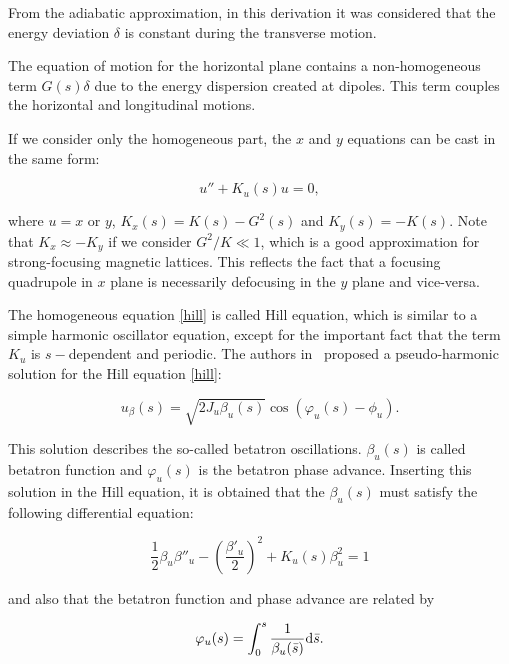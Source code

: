 From the adiabatic approximation, in this derivation it was considered that the energy deviation $\delta$ is constant during the transverse motion.

The equation of motion for the horizontal plane contains a non-homogeneous term $G(s)\delta$ due to the energy dispersion created at dipoles. This term couples the horizontal and longitudinal motions.

If we consider only the homogeneous part, the $x$ and $y$ equations can be cast in the same form:

\begin{equation}
u'' + K_u(s) u = 0,
\label{hill}
\end{equation}

where $u = x$ or $y$, $K_x(s) = K(s) - G^2(s)$ and $K_y(s) = -K(s)$. Note that $K_x \approx -K_y$ if we consider $G^2/K \ll 1$, which is a good approximation for strong-focusing magnetic lattices. This reflects the fact that a focusing quadrupole in $x$ plane is necessarily defocusing in the $y$ plane and vice-versa. 

The homogeneous equation \eqref{hill} is called Hill equation, which is similar to a simple harmonic oscillator equation, except for the important fact that the term $K_u$ is $s-$dependent and periodic. The authors in~\cite{CourantSnyder1958} proposed a pseudo-harmonic solution for the Hill equation \eqref{hill}:

\begin{equation}
    u_{\beta}(s) = \sqrt{2 J_u \beta_u (s)} \cos \left(\varphi_u(s) - \phi_u\right).
    \label{eq:beta_oscillation}
\end{equation}

This solution describes the so-called betatron oscillations. $\beta_u(s)$ is called betatron function and $\varphi_u(s)$ is the betatron phase advance. Inserting this solution in the Hill equation, it is obtained that the $\beta_u(s)$ must satisfy the following differential equation:

\begin{equation}
    \dfrac{1}{2}\beta_u {\beta''_u} -  \left(\dfrac{\beta'_u}{2}\right)^2 + K_u(s) \beta^2_u = 1
    \label{beta_equation}
\end{equation}

and also that the betatron function and phase advance are related by

\begin{equation}
\varphi_u(s) = \int_{0}^{s} \dfrac{1}{\beta_u(\bar{s})} \mathrm{d} \bar{s}.
\end{equation}

